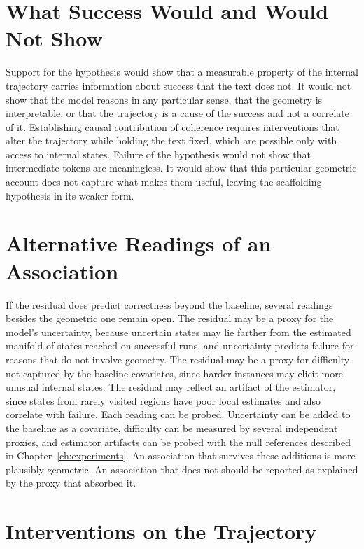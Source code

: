 \section{What Success Would and Would Not Show}

Support for the hypothesis would show that a measurable property of the internal trajectory carries information about success that the text does not. It would not show that the model reasons in any particular sense, that the geometry is interpretable, or that the trajectory is a cause of the success and not a correlate of it. Establishing causal contribution of coherence requires interventions that alter the trajectory while holding the text fixed, which are possible only with access to internal states. Failure of the hypothesis would not show that intermediate tokens are meaningless. It would show that this particular geometric account does not capture what makes them useful, leaving the scaffolding hypothesis in its weaker form.

\section{Alternative Readings of an Association}

If the residual does predict correctness beyond the baseline, several readings besides the geometric one remain open. The residual may be a proxy for the model's uncertainty, because uncertain states may lie farther from the estimated manifold of states reached on successful runs, and uncertainty predicts failure for reasons that do not involve geometry. The residual may be a proxy for difficulty not captured by the baseline covariates, since harder instances may elicit more unusual internal states. The residual may reflect an artifact of the estimator, since states from rarely visited regions have poor local estimates and also correlate with failure. Each reading can be probed. Uncertainty can be added to the baseline as a covariate, difficulty can be measured by several independent proxies, and estimator artifacts can be probed with the null references described in Chapter~\ref{ch:experiments}. An association that survives these additions is more plausibly geometric. An association that does not should be reported as explained by the proxy that absorbed it.

\section{Interventions on the Trajectory}

